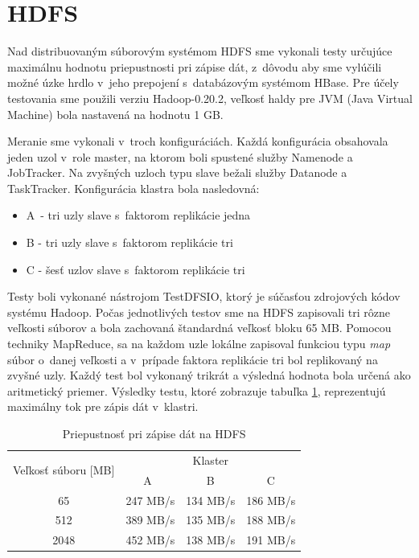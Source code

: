 \documentclass[11pt,twoside,a4paper]{book}
\begin{document}
\section{HDFS}
Nad distribuovaným súborovým systémom HDFS sme vykonali testy určujúce maximálnu hodnotu priepustnosti pri zápise dát, z~dôvodu aby sme vylúčili možné úzke hrdlo v~jeho prepojení s~databázovým systémom HBase. Pre účely testovania sme použili verziu Hadoop-0.20.2, veľkosť haldy pre JVM (Java Virtual Machine) bola nastavená na hodnotu 1 GB.

Meranie sme vykonali v~troch konfiguráciách. Každá konfigurácia obsahovala jeden uzol v~role master, na ktorom boli spustené služby Namenode a JobTracker. Na zvyšných uzloch typu slave bežali služby Datanode a TaskTracker. Konfigurácia klastra bola nasledovná:

\begin{itemize}
 \item A~- tri uzly slave s~faktorom replikácie jedna
 \item B - tri uzly slave s~faktorom replikácie tri
 \item C - šesť uzlov slave s~faktorom replikácie tri
\end{itemize}

Testy boli vykonané nástrojom TestDFSIO, ktorý je súčasťou zdrojových kódov systému Hadoop. Počas jednotlivých testov sme na HDFS zapisovali tri rôzne veľkosti súborov a bola zachovaná štandardná veľkosť bloku 65 MB. Pomocou techniky MapReduce, sa na každom uzle lokálne zapisoval funkciou typu \emph{map} súbor o~danej veľkosti a v~prípade faktora replikácie tri bol replikovaný na zvyšné uzly. Každý test bol vykonaný trikrát a výsledná hodnota bola určená ako aritmetický priemer. Výsledky testu, ktoré zobrazuje tabuľka \ref{tab:HDFSperformance}, reprezentujú maximálny tok pre zápis dát v~klastri.

\begin{table}[hp]
\begin{center}
\begin{tabular}{|c|c|c|c|}
\hline 
\multirow{2}{*}{Veľkosť súboru [MB]} & \multicolumn{3}{|c|}{Klaster}  \\

& A~& B & C\\
\hline 65 & 247 MB/s& 134 MB/s& 186 MB/s\\ 
\hline 512 & 389 MB/s& 135 MB/s& 188 MB/s\\ 
\hline 2048 & 452 MB/s& 138 MB/s& 191 MB/s\\ 
\hline
\end{tabular} 
\end{center}
\caption{Priepustnosť pri zápise dát na HDFS}
\label{tab:HDFSperformance}
\end{table}
\end{document}
